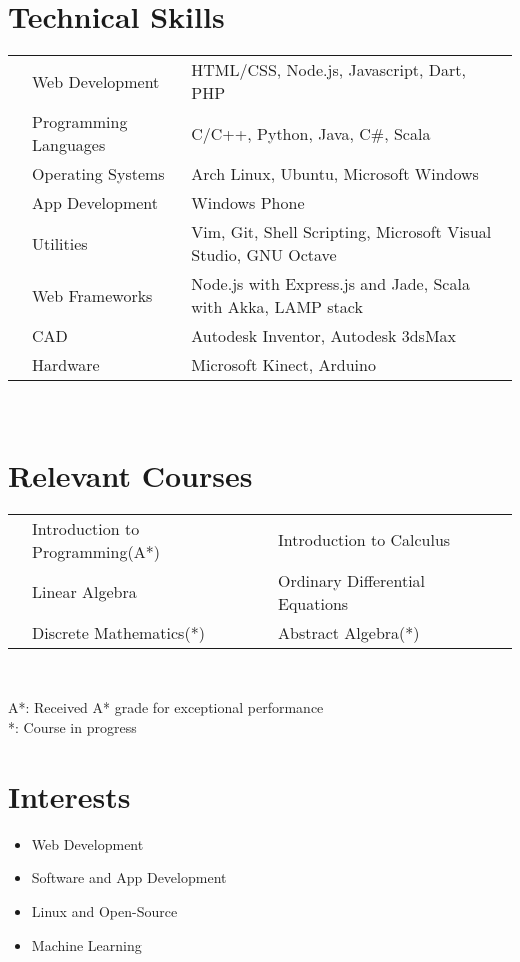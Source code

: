 \documentclass[11pt,a4paper]{article}
\begin{document}
\section*{Technical Skills}
\begin{tabular}{L{0.05cm} L{5cm} l}
&Web Development 	        &HTML/CSS, Node.js, Javascript, Dart, PHP \\
&Programming Languages      &C/C++, Python, Java, C\#, Scala\\
&Operating Systems	        &Arch Linux, Ubuntu, Microsoft Windows\\
&App Development		    &Windows Phone\\
&Utilities                  &Vim, Git, Shell Scripting, Microsoft Visual Studio, GNU Octave\\
&Web Frameworks             &Node.js with Express.js and Jade, Scala with Akka, LAMP stack\\
&CAD	                	&Autodesk Inventor, Autodesk 3dsMax\\
&Hardware                   &Microsoft Kinect, Arduino\\

\end{tabular}\\


\section*{Relevant Courses}
\begin{tabular}{L{0.05cm} L{6cm} L{5.5cm} L{5.5cm}}
& Introduction to Programming(A*)   & Introduction to Calculus        \\
& Linear Algebra                    & Ordinary Differential  Equations\\
& Discrete Mathematics(*)           & Abstract Algebra(*)\\
\end{tabular}\\

\begin{flushright}
\footnotesize{A*: Received A* grade for exceptional performance}\\
\footnotesize{*: Course in progress}\\
\end{flushright}

\section*{Interests}
\begin {itemize}
\setlength\itemsep{0em}		%
\item Web Development
\item Software and App Development
\item Linux and Open-Source
\item Machine Learning
\end{itemize}

\
\end{document}

